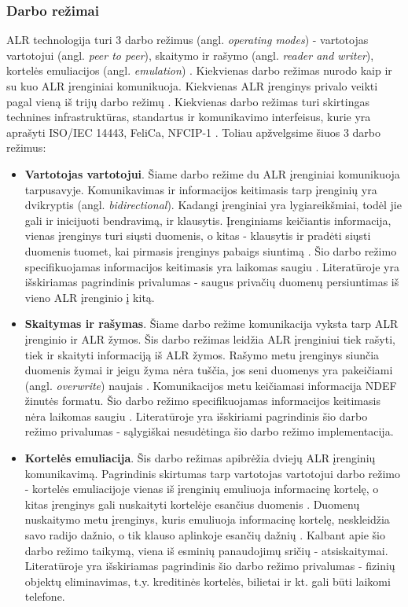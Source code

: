 \subsubsection{Darbo režimai}
ALR technologija turi 3 darbo režimus (angl. \textit{operating modes}) - vartotojas vartotojui (angl. \textit{peer to peer}), skaitymo ir rašymo (angl. \textit{reader and writer}), kortelės emuliacijos (angl. \textit{emulation}) \cite{whitepaper2}. Kiekvienas darbo režimas nurodo kaip ir su kuo ALR įrenginiai komunikuoja. Kiekvienas ALR įrenginys privalo veikti pagal vieną iš trijų darbo režimų \cite{Motlagh2012}. Kiekvienas darbo režimas turi skirtingas technines infrastruktūras, standartus ir komunikavimo interfeisus, kurie yra aprašyti ISO/IEC 14443, FeliCa, NFCIP-1 \cite{Leora1980}.
Toliau apžvelgsime šiuos 3 darbo režimus:
\begin{itemize}
    \item \textbf{Vartotojas vartotojui}. Šiame darbo režime du ALR įrenginiai komunikuoja tarpusavyje. Komunikavimas ir informacijos keitimasis tarp įrenginių yra dvikryptis (angl. \textit{bidirectional}). Kadangi įrenginiai yra lygiareikšmiai, todėl jie gali ir inicijuoti bendravimą, ir klausytis. Įrenginiams keičiantis informacija, vienas įrenginys turi siųsti duomenis, o kitas - klausytis ir pradėti siųsti duomenis tuomet, kai pirmasis įrenginys pabaigs siuntimą \cite{Leora1980}. Šio darbo režimo specifikuojamas informacijos keitimasis yra laikomas saugiu \cite{Rahul2015}. Literatūroje \cite{Leora1980} yra išskiriamas pagrindinis privalumas - saugus privačių duomenų persiuntimas iš vieno ALR įrenginio į kitą.
    \item \textbf{Skaitymas ir rašymas}. Šiame darbo režime komunikacija vyksta tarp ALR įrenginio ir ALR žymos. Šis darbo režimas leidžia ALR įrenginiui tiek rašyti, tiek ir skaityti informaciją iš ALR žymos. Rašymo metu įrenginys siunčia duomenis žymai ir jeigu žyma nėra tuščia, jos seni duomenys yra pakeičiami (angl. \textit{overwrite}) naujais \cite{Leora1980}. Komunikacijos metu keičiamasi informacija NDEF žinutės formatu. Šio darbo režimo specifikuojamas informacijos keitimasis nėra laikomas saugiu \cite{Rahul2015}. Literatūroje \cite{Leora1980} yra išskiriami pagrindinis šio darbo režimo privalumas - sąlygiškai nesudėtinga šio darbo režimo implementacija.
    \item \textbf{Kortelės emuliacija}. Šis darbo režimas apibrėžia dviejų ALR įrenginių komunikavimą. Pagrindinis skirtumas tarp vartotojas vartotojui darbo režimo - kortelės emuliacijoje vienas iš įrenginių emuliuoja informacinę kortelę, o kitas įrenginys gali nuskaityti kortelėje esančius duomenis \cite{Motlagh2012}. Duomenų nuskaitymo metu įrenginys, kuris emuliuoja informacinę kortelę, neskleidžia savo radijo dažnio, o tik klauso aplinkoje esančių dažnių \cite{Leora1980}. Kalbant apie šio darbo režimo taikymą, viena iš esminių panaudojimų sričių - atsiskaitymai. Literatūroje \cite{Leora1980} yra išskiriamas pagrindinis šio darbo režimo privalumas - fizinių objektų eliminavimas, t.y. kreditinės kortelės, bilietai ir kt. gali būti laikomi telefone.
\end{itemize}

